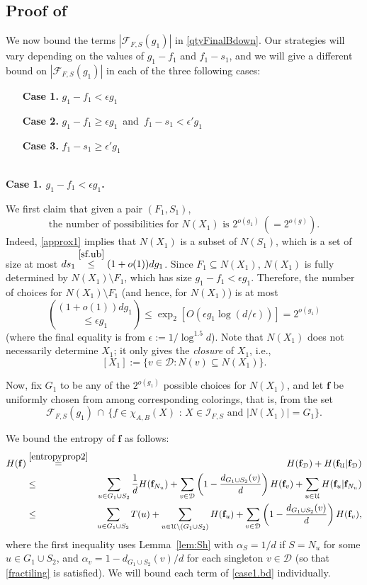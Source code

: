 \documentclass{amsart}
\theoremstyle{definition}
\newcommand{\cD}{\mathcal{D} }
\newcommand{\cF}{\mathcal{F} }
\newcommand{\cU}{\mathcal{U} }
\newcommand{\bbf}{\mathbf{f}}
\newcommand{\beq}[1]{\begin{equation}\label{#1}}
\newcommand{\enq}[0]{\end{equation}}
\newcommand{\eps}{\epsilon}
\newcommand{\sub}[0]{\subseteq}
\newcommand{\0}[0]{\emptyset}
\begin{document}
\subsection{Proof of }\label{subsec.step2.pf}

We now bound the terms $|\cF_{F, S}(g_1)|$ in \eqref{qtyFinalBdown}. Our strategies will vary depending on the values of $g_1 - f_1$ and $f_1 - s_1$, and we will give a different bound on $|\cF_{F, S}(g_1)|$ in each of the three following cases:
\begin{itemize}
	\item[\textbf{Case 1.}] $g_1-f_1<\eps g_1$
	\item[\textbf{Case 2.}] $g_1-f_1 \ge \eps g_1$\, and\, $f_1-s_1 < \eps' g_1$
	\item[\textbf{Case 3.}]	$f_1-s_1 \ge \eps' g_1$
\end{itemize}

\mbox{}\\\noindent\textbf{Case 1. $g_1-f_1<\eps g_1$.} 

We first claim that given a pair $(F_1,S_1)$, 
\beq{NX.cost} \mbox{the number of possibilities for $N(X_1)$  is $2^{o(g_1)} ~ (=2^{o(g)})$.} \enq
 Indeed, \eqref{approx1} implies that $N(X_1)$ is a subset of $N(S_1)$, which is a set of size at most $ds_1 \stackrel{\eqref{sf.ub}}{\le} (1+o(1))dg_1$. Since $F_1 \sub N(X_1)$, $N(X_1)$ is fully determined by $N(X_1) \setminus F_1$, which has size $g_1-f_1<\eps g_1$. Therefore, the number of choices for $N(X_1) \setminus F_1$ (and hence, for $N(X_1)$) is at most 
\[{(1+o(1))dg_1 \choose \le \eps g_1}\le \exp_2[O(\eps g_1\log(d/\eps))]
{=}2^{o(g_1)}\]
(where the final equality is from $\eps:=1/\log^{1.5} d$). Note that $N(X_1)$ does not necessarily determine $X_1$; it only gives the \textit{closure} of $X_1$, i.e., \[[X_1]:=\{v \in \cD:N(v) \sub N(X_1)\}.\] 

Now, fix $G_1$ to be any of the $2^{o(g_1)}$ possible choices for $N(X_1)$, and let $\bbf$ be uniformly chosen from among corresponding colorings, that is, from the set
\[\cF_{F, S}(g_1)\,\cap\, \{\mbox{$f \in \chi_{A,B}(X)$ :  $X\in\mathcal{I}_{F, S}$ and $|N(X_1)|=G_1$}\}.\]  

We bound the entropy of $\mathbf{f}$ as follows:
\begin{eqnarray}
H(\bbf)&\stackrel{\eqref{entropyprop2}}{=}& H(\bbf_\cD)+H(\bbf_\cU|\bbf_\cD)\nonumber\\
&\le & \sum_{u \in G_1 \cup S_2}\frac1dH(\bbf_{N_u}) + \sum_{v \in \cD}\left(1-\frac{d_{G_1 \cup S_2}(v)}{d}\right)H(\bbf_v)+\sum_{u\in\cU}H(\bbf_u|\bbf_{N_u})\nonumber\\
&\le & \sum_{u \in G_1 \cup S_2}T(u)+\sum_{u \in \cU \setminus (G_1 \cup S_2)} H(\bbf_u)+\sum_{v \in \cD}\left(1-\frac{d_{G_1 \cup S_2}(v)}{d}\right)H(\bbf_v),\label{case1.bd}
\end{eqnarray}
where the first inequality uses Lemma~\ref{lem:Sh} with $\alpha_S=1/d$ if $S=N_u$ for some $u \in G_1 \cup S_2$, and $\alpha_v=1-d_{G_1 \cup S_2}(v)/d$ for each singleton $v \in \cD$ (so that \eqref{fractiling} is satisfied).
We will bound each term of \eqref{case1.bd} individually.\\
\end{document}
